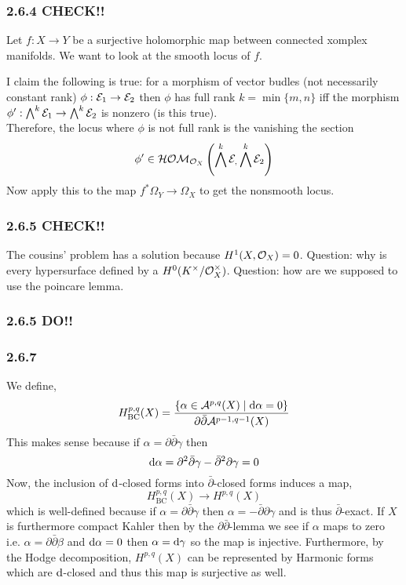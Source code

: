 \documentclass[12pt]{article}
\begin{document}
\subsubsection{2.6.4 CHECK!!}

Let $f : X \to Y$ be a surjective holomorphic map between connected xomplex manifolds. We want to look at the smooth locus of $f$.

I claim the following is true: for a morphism of vector budles (not necessarily constant rank) $\phi : \mathcal{E}_1 \to \mathcal{E}_2$ then $\phi$ has full rank $k = \min{\{m, n \}}$ iff the morphism $\phi' : \bigwedge^k \mathcal{E}_1 \to \bigwedge^k \mathcal{E}_2$ is nonzero (is this true).
\bigskip\\
Therefore, the locus where $\phi$ is not full rank is the vanishing the section
\[ \phi' \in \mathcal{HOM}_{\mathcal{O}_{X}}\left(\bigwedge^k \mathcal{E}_, \bigwedge^k \mathcal{E}_2\right) \]
Now apply this to the map $f^* \Omega_Y \to \Omega_X$ to get the nonsmooth 
locus.

\subsubsection{2.6.5 CHECK!!}

The cousins' problem has a solution because $H^1(X, \mathcal{O}_{X}) = 0$. Question: why is every hypersurface defined by a $H^0(K^\times / \mathcal{O}_{X}^\times)$. Question: how are we supposed to use the poincare lemma.

\subsubsection{2.6.5 DO!!}

\subsubsection{2.6.7}

\newcommand{\A}{\mathcal{A}}

We define,
\[ H^{p,q}_{\mathrm{BC}}(X) = \frac{\{ \alpha \in \A^{p,q}(X) \mid \d{\alpha} = 0 \}}{ \partial \bar{\partial} \A^{p-1,q-1}(X)} \] 
This makes sense because if $\alpha = \partial \bar{\partial} \gamma$ then \[ \mathrm{d}{\alpha} = \partial^2 \bar{\partial} \gamma - \bar{\partial}^2 \partial \gamma = 0 \]
Now, the inclusion of $\mathrm{d}{}$-closed forms into $\bar{\partial}$-closed forms induces a map,
\[ H^{p,q}_{\mathrm{BC}}(X) \to H^{p,q}(X) \]
which is well-defined because if $\alpha = \partial \bar{\partial} \gamma$ then $\alpha = - \bar{\partial} \partial \gamma$ and is thus $\bar{\partial}$-exact. If $X$ is furthermore compact Kahler then by the $\partial \bar{\partial}$-lemma we see if $\alpha$ maps to zero i.e. $\alpha = \partial \bar{\partial} \beta$ and $\mathrm{d}{\alpha} = 0$ then $\alpha = \mathrm{d}{\gamma}$ so the map is injective. Furthermore, by the Hodge decomposition, $H^{p,q}(X)$ can be represented by Harmonic forms which are $\mathrm{d}$-closed and thus this map is surjective as well.
\end{document}

